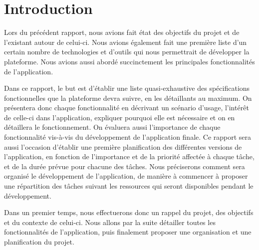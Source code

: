 \section{Introduction}
\label{sec:intro}

    Lors du précédent rapport, nous avions fait état des objectifs du projet et de l'existant autour de celui-ci. Nous avions également fait
    une première liste d'un certain nombre de technologies et d'outils qui nous permettrait de développer la plateforme. Nous avions aussi abordé
    succinctement les principales fonctionnalités de l'application.

    Dans ce rapport, le but est d'établir une liste quasi-exhaustive des spécifications fonctionnelles que la plateforme devra suivre,
    en les détaillants au maximum. On présentera donc chaque fonctionnalité en décrivant un scénario d'usage, l'intérêt de celle-ci
    dans l'application, expliquer pourquoi elle est nécessaire et on en détaillera le fonctionnement. On évaluera aussi l'importance de
    chaque fonctionnalité vis-à-vis du développement de l'application finale. Ce rapport sera aussi l'occasion d'établir une première
    planification des différentes versions de l'application, en fonction de l'importance et de la priorité affectée à chaque tâche,
    et de la durée prévue pour chacune des tâches. Nous préciserons comment sera organisé le développement de l'application, de manière
    à commencer à proposer une répartition des tâches suivant les ressources qui seront disponibles pendant le développement.

    Dans un premier temps, nous effectuerons donc un rappel du projet, des objectifs et du contexte de celui-ci. Nous allons par la suite
    détailler toutes les fonctionnalités de l'application, puis finalement proposer une organisation et une planification du projet.
